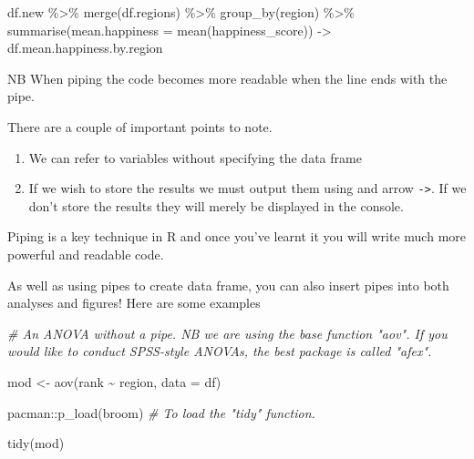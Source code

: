 \documentclass[]{article}
\newenvironment{Shaded}{\begin{snugshade}}{\end{snugshade}}
\newcommand{\AttributeTok}[1]{\textcolor[rgb]{0.77,0.63,0.00}{#1}}
\newcommand{\CommentTok}[1]{\textcolor[rgb]{0.56,0.35,0.01}{\textit{#1}}}
\newcommand{\FunctionTok}[1]{\textcolor[rgb]{0.00,0.00,0.00}{#1}}
\newcommand{\NormalTok}[1]{#1}
\newcommand{\OtherTok}[1]{\textcolor[rgb]{0.56,0.35,0.01}{#1}}
\newcommand{\SpecialCharTok}[1]{\textcolor[rgb]{0.00,0.00,0.00}{#1}}
\providecommand{\tightlist}{%
  \setlength{\itemsep}{0pt}\setlength{\parskip}{0pt}}
\begin{document}
\begin{Shaded}
\begin{Highlighting}[]
\NormalTok{df.new }\SpecialCharTok{\%\textgreater{}\%} 
  \FunctionTok{merge}\NormalTok{(df.regions) }\SpecialCharTok{\%\textgreater{}\%} 
  \FunctionTok{group\_by}\NormalTok{(region) }\SpecialCharTok{\%\textgreater{}\%}
  \FunctionTok{summarise}\NormalTok{(}\AttributeTok{mean.happiness =} \FunctionTok{mean}\NormalTok{(happiness\_score)) }\OtherTok{{-}\textgreater{}}
\NormalTok{  df.mean.happiness.by.region}
\end{Highlighting}
\end{Shaded}

NB When piping the code becomes more readable when the line ends with
the pipe.

There are a couple of important points to note.

\begin{enumerate}
\def\labelenumi{(\arabic{enumi})}
\tightlist
\item
  We can refer to variables without specifying the data frame
\item
  If we wish to store the results we must output them using and arrow
  \texttt{-\textgreater{}}. If we don't store the results they will
  merely be displayed in the console.
\end{enumerate}

Piping is a key technique in R and once you've learnt it you will write
much more powerful and readable code.

As well as using pipes to create data frame, you can also insert pipes
into both analyses and figures! Here are some examples

\begin{Shaded}
\begin{Highlighting}[]
\CommentTok{\# An ANOVA without a pipe. NB we are using the base function "aov". If you would like to conduct SPSS{-}style ANOVAs, the best package is called "afex".}



\NormalTok{mod }\OtherTok{\textless{}{-}} \FunctionTok{aov}\NormalTok{(rank }\SpecialCharTok{\textasciitilde{}}\NormalTok{ region, }\AttributeTok{data =}\NormalTok{ df)}

\NormalTok{pacman}\SpecialCharTok{::}\FunctionTok{p\_load}\NormalTok{(broom) }\CommentTok{\# To load the "tidy" function.}

\FunctionTok{tidy}\NormalTok{(mod)}
\end{Highlighting}
\end{Shaded}
\end{document}
